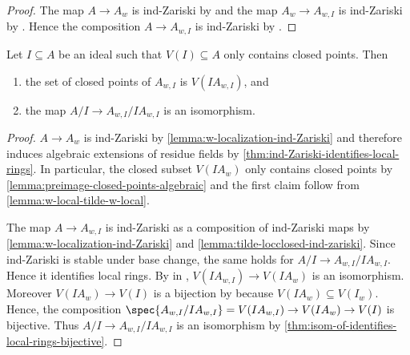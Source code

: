 \begin{proof}
  \leanok
  The map $A \to A_w$ is ind-Zariski by  and
  the map $A_w \to A_{w, I}$ is ind-Zariski by .
  Hence the composition $A \to A_{w, I}$ is ind-Zariski by .
\end{proof}

\begin{lemma}
    \label{lemma:closed-closed-points-tilde-w-local}
    \leanok
    Let $I \subseteq A$ be an ideal such that $V(I) \subseteq A$ only contains closed points. Then
    \begin{enumerate}
        \item the set of closed points of $A_{w, I}$ is $V(IA_{w, I})$, and
        \item the map $A / I \to A_{w, I} / I A_{w, I}$ is an isomorphism. \label{item:closed-closed-points-tilde-w-local-quot-isom}
    \end{enumerate}
\end{lemma}

\begin{proof}
    \leanok
    $A \to A_w$ is ind-Zariski by \ref{lemma:w-localization-ind-Zariski} and therefore induces
    algebraic extensions of residue fields by \ref{thm:ind-Zariski-identifies-local-rings}.
    In particular, the closed subset $V(I A_w)$ only contains
    closed points by \ref{lemma:preimage-closed-points-algebraic} and
    the first claim follow from \ref{lemma:w-local-tilde-w-local}.

    The map $A \to A_{w, I}$ is ind-Zariski as a composition of ind-Zariski maps by
    \ref{lemma:w-localization-ind-Zariski} and \ref{lemma:tilde-locclosed-ind-zariski}.
    Since ind-Zariski is stable under base change, the same holds for $A/I \to A_{w, I}/IA_{w, I}$.
    Hence it identifies local rings. By  in ,
    $V(IA_{w, I}) \to V(I A_w)$ is an isomorphism. Moreover
    $V(I A_{w}) \to V(I)$ is a bijection by 
    because $V(I A_{w}) \subseteq V(I_w)$. Hence, the composition
    $\spec{A_{w, I} / I A_{w, I}} = V(I A_{w, I}) \to V(I A_w) \to V(I)$ is bijective. Thus
    $A / I \to A_{w, I} / I A_{w, I}$ is an isomorphism by \ref{thm:isom-of-identifies-local-rings-bijective}.
\end{proof}


